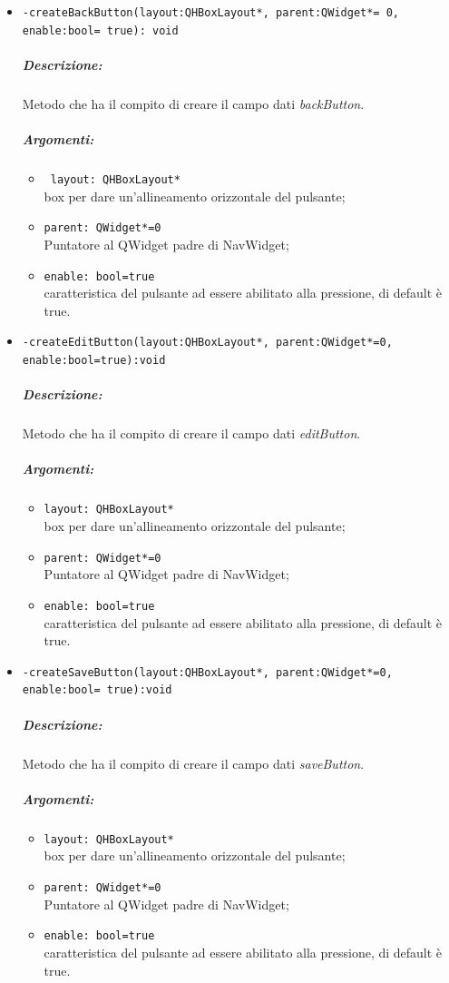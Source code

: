 \begin{itemize}
\color{black}
\item \color{blue}\verb!-createBackButton(layout:QHBoxLayout*, parent:QWidget*= 0, enable:bool= true): void!
\color{black}
\subparagraph{Descrizione: }Metodo che ha il compito di creare il campo dati \emph{backButton}.
\subparagraph{Argomenti:}
\begin{itemize}
\item \color{RoyalPurple} \verb! layout: QHBoxLayout*! \\ box per dare un'allineamento orizzontale del pulsante;
\item  \color{RoyalPurple} \verb!parent: QWidget*=0 ! \\ Puntatore al QWidget padre di NavWidget;
\item  \color{RoyalPurple} \verb!enable: bool=true! \\ caratteristica del pulsante ad essere abilitato alla pressione, di default è true.
\end{itemize}

\item \color{blue}\verb!-createEditButton(layout:QHBoxLayout*, parent:QWidget*=0, enable:bool=true):void!
\color{black}
\subparagraph{Descrizione: }Metodo che ha il compito di creare il campo dati \emph{editButton}.
\subparagraph{Argomenti: }
\begin{itemize}
\item  \color{RoyalPurple} \verb!layout: QHBoxLayout* !\\ box per dare un'allineamento orizzontale del pulsante;
\item  \color{RoyalPurple} \verb!parent: QWidget*=0!  \\ Puntatore al QWidget padre di NavWidget;
\item  \color{RoyalPurple} \verb!enable: bool=true !\\ caratteristica del pulsante ad essere abilitato alla pressione, di default è true.
\end{itemize}

\item \color{blue}\verb!-createSaveButton(layout:QHBoxLayout*, parent:QWidget*=0, enable:bool= true):void!
\color{black}
\subparagraph{Descrizione: }Metodo che ha il compito di creare il campo dati \emph{saveButton}.
\subparagraph{Argomenti:}
\begin{itemize}
\item  \color{RoyalPurple} \verb!layout: QHBoxLayout* !\\ box per dare un'allineamento orizzontale del pulsante;
\item  \color{RoyalPurple} \verb!parent: QWidget*=0 ! \\ Puntatore al QWidget padre di NavWidget;
\item  \color{RoyalPurple} \verb!enable: bool=true !\\ caratteristica del pulsante ad essere abilitato alla pressione, di default è true.
\end{itemize}


\end{itemize}
